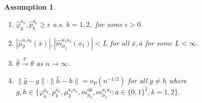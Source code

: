 \documentclass{article}
\newcommand{\wh}{\widehat}
\newcommand{\pk}{{\varphi}}
\newcommand{\pr}{\mathbb{P}}
\newtheorem{assumption}{Assumption}
\begin{document}
\begin{assumption} \ \label{A10}
	\begin{enumerate}
	\item $\wh{\pk}_k^{\bar a_k}, \wh p_k^{\bar a_k} \ge \epsilon$ a.s. $k=1,2,$ for some $\epsilon > 0$.
	\item
		$|\wh\mu_2^{a_1a_2}(\bar x)|, |\wh m_{\mu_2}^{a_1a_2}(x_1)| < L$ for all $\bar x, \bar a$ for some $L<\infty.$
	\item $\hat\theta \overset{\pr}\to \theta$ as $n\to\infty$.
	\item $\|\hat g - g\| \cdot \|\hat h - h\| = o_{P}(n^{-1/2})$ for all $g \ne h$ where $g,h \in \{ \pk_k^{\bar a_k}, p_k^{\bar a_k}, \mu_2^{a_1a_2}, m_{p_2}^{00}, m_{\mu_2}^{a_1a_2}: \bar a\in\{0,1\}^2, k=1,2 \}$.
	\end{enumerate}
\end{assumption}
\end{document}
